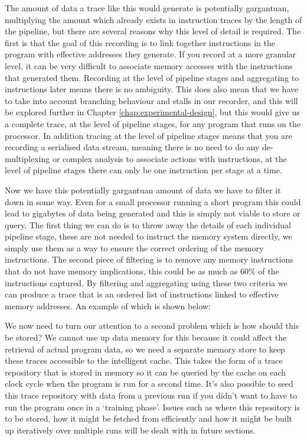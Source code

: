 The amount of data a trace like this would generate is potentially gargantuan, multiplying the amount which already exists in instruction traces by the length of the pipeline, but there are several reasons why this level of detail is required. The first is that the goal of this recording is to link together instructions in the program with effective addresses they generate. If you record at a more granular level, it can be very difficult to associate memory accesses with the instructions that generated them. Recording at the level of pipeline stages and aggregating to instructions later means there is no ambiguity. This does also mean that we have to take into account branching behaviour and stalls in our recorder, and this will be explored further in Chapter \ref{chap:experimental-design}, but this would give us a complete trace, at the level of pipeline stages, for any program that runs on the processor. In addition tracing at the level of pipeline stages means that you are recording a serialised data stream, meaning there is no need to do any de-multiplexing or complex analysis to associate actions with instructions, at the level of pipeline stages there can only be one instruction per stage at a time. 

Now we have this potentially gargantuan amount of data we have to filter it down in some way. Even for a small processor running a short program this could lead to gigabytes of data being generated and this is simply not viable to store or query. The first thing we can do is to throw away the details of each individual pipeline stage, these are not needed to instruct the memory system directly, we simply use them as a way to ensure the correct ordering of the memory instructions. The second piece of filtering is to remove any memory instructions that do not have memory implications, this could be as much as 60\% of the instructions captured. By filtering and aggregating using these two criteria we can produce a trace that is an ordered list of instructions linked to effective memory addresses. An example of which is shown below:


We now need to turn our attention to a second problem which is how should this be stored? We cannot use up data memory for this because it could affect the retrieval of actual program data, so we need a separate memory store to keep these traces accessible to the intelligent cache. This takes the form of a trace repository that is stored in memory so it can be queried by the cache on each clock cycle when the program is run for a second time. It's also possible to seed this trace repository with data from a previous run if you didn't want to have to run the program once in a `training phase'. Issues such as where this repository is to be stored, how it might be fetched from efficiently and how it might be built up iteratively over multiple runs will be dealt with in future sections. 

